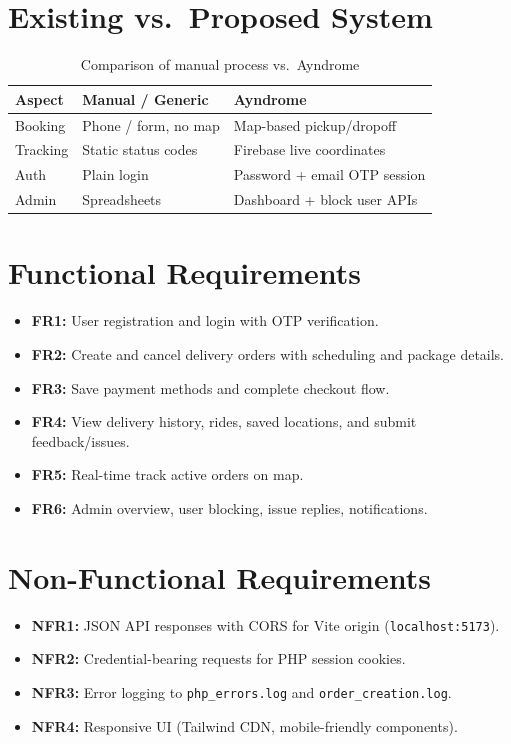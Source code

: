 \documentclass[12pt,a4paper,oneside]{report}
\begin{document}
\section{Existing vs.\ Proposed System}
\begin{table}[H]
    \centering
    \caption{Comparison of manual process vs.\ Ayndrome}
    \label{tab:comparison}
    \begin{tabular}{@{}p{}p{}p{}@{}}
        \toprule
        \textbf{Aspect} & \textbf{Manual / Generic} & \textbf{Ayndrome} \\
        \midrule
        Booking & Phone / form, no map & Map-based pickup/dropoff \\
        Tracking & Static status codes & Firebase live coordinates \\
        Auth & Plain login & Password + email OTP session \\
        Admin & Spreadsheets & Dashboard + block user APIs \\
        \bottomrule
    \end{tabular}
\end{table}

\section{Functional Requirements}
\begin{itemize}
    \item \textbf{FR1:} User registration and login with OTP verification.
    \item \textbf{FR2:} Create and cancel delivery orders with scheduling and package details.
    \item \textbf{FR3:} Save payment methods and complete checkout flow.
    \item \textbf{FR4:} View delivery history, rides, saved locations, and submit feedback/issues.
    \item \textbf{FR5:} Real-time track active orders on map.
    \item \textbf{FR6:} Admin overview, user blocking, issue replies, notifications.
\end{itemize}

\section{Non-Functional Requirements}
\begin{itemize}
    \item \textbf{NFR1:} JSON API responses with CORS for Vite origin (\texttt{localhost:5173}).
    \item \textbf{NFR2:} Credential-bearing requests for PHP session cookies.
    \item \textbf{NFR3:} Error logging to \texttt{php\_errors.log} and \texttt{order\_creation.log}.
    \item \textbf{NFR4:} Responsive UI (Tailwind CDN, mobile-friendly components).
\end{itemize}
\end{document}
